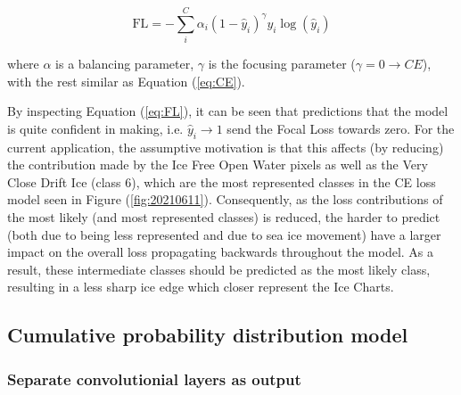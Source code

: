 \documentclass[../main/thesis]{subfiles}
\begin{document}
\begin{equation}
    \label{eq:FL}
    \text{FL} = -\sum_i^C\alpha_i(1 - \hat{y}_i)^\gamma y_i\log{(\hat{y}_i)}
\end{equation}

where $\alpha$ is a balancing parameter, $\gamma$ is the focusing parameter ($\gamma = 0 \rightarrow CE$), with the rest similar as Equation (\ref{eq:CE}).

By inspecting Equation (\ref{eq:FL}), it can be seen that predictions that the model is quite confident in making, i.e. $\hat{y}_i \rightarrow 1$ send the Focal Loss towards zero. For the current application, the assumptive motivation is that this affects (by reducing) the contribution made by the Ice Free Open Water pixels as well as the Very Close Drift Ice (class 6), which are the most represented classes in the CE loss model seen in Figure (\ref{fig:20210611}). Consequently, as the loss contributions of the most likely (and most represented classes) is reduced, the harder to predict (both due to being less represented and due to sea ice movement) have a larger impact on the overall loss propagating backwards throughout the model. As a result, these intermediate classes should be predicted as the most likely class, resulting in a less sharp ice edge which closer represent the Ice Charts. 


\subsection{Cumulative probability distribution model}

\subsubsection{Separate convolutionial layers as output}
\end{document}
